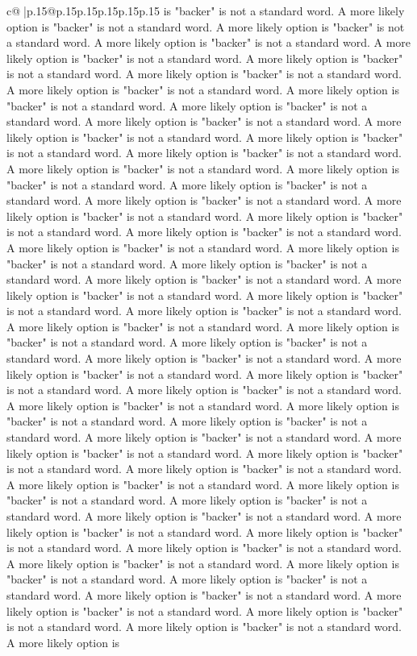 \documentclass{article}
\begin{document}
{\begin{supertabular}{c@{$\;$}|p{.15\linewidth}@{}p{.15\linewidth}p{.15\linewidth}p{.15\linewidth}p{.15\linewidth}p{.15\linewidth}}
{{{is "backer" is not a standard word. A more likely option is "backer" is not a standard word. A more likely option is "backer" is not a standard word. A more likely option is "backer" is not a standard word. A more likely option is "backer" is not a standard word. A more likely option is "backer" is not a standard word. A more likely option is "backer" is not a standard word. A more likely option is "backer" is not a standard word. A more likely option is "backer" is not a standard word. A more likely option is "backer" is not a standard word. A more likely option is "backer" is not a standard word. A more likely option is "backer" is not a standard word. A more likely option is "backer" is not a standard word. A more likely option is "backer" is not a standard word. A more likely option is "backer" is not a standard word. A more likely option is "backer" is not a standard word. A more likely option is "backer" is not a standard word. A more likely option is "backer" is not a standard word. A more likely option is "backer" is not a standard word. A more likely option is "backer" is not a standard word. A more likely option is "backer" is not a standard word. A more likely option is "backer" is not a standard word. A more likely option is "backer" is not a standard word. A more likely option is "backer" is not a standard word. A more likely option is "backer" is not a standard word. A more likely option is "backer" is not a standard word. A more likely option is "backer" is not a standard word. A more likely option is "backer" is not a standard word. A more likely option is "backer" is not a standard word. A more likely option is "backer" is not a standard word. A more likely option is "backer" is not a standard word. A more likely option is "backer" is not a standard word. A more likely option is "backer" is not a standard word. A more likely option is "backer" is not a standard word. A more likely option is "backer" is not a standard word. A more likely option is "backer" is not a standard word. A more likely option is "backer" is not a standard word. A more likely option is "backer" is not a standard word. A more likely option is "backer" is not a standard word. A more likely option is "backer" is not a standard word. A more likely option is "backer" is not a standard word. A more likely option is "backer" is not a standard word. A more likely option is "backer" is not a standard word. A more likely option is "backer" is not a standard word. A more likely option is "backer" is not a standard word. A more likely option is "backer" is not a standard word. A more likely option is "backer" is not a standard word. A more likely option is "backer" is not a standard word. A more likely option is "backer" is not a standard word. A more likely option is "backer" is not a standard word. A more likely option is "backer" is not a standard word. A more likely option is "backer" is not a standard word. A more likely option is "backer" is not a standard word. A more likely option is "backer" is not a standard word. A more likely option is "backer" is not a standard word. A more likely option is "backer" is not a standard word. A more likely option is }}}
\end{supertabular}}
\end{document}
